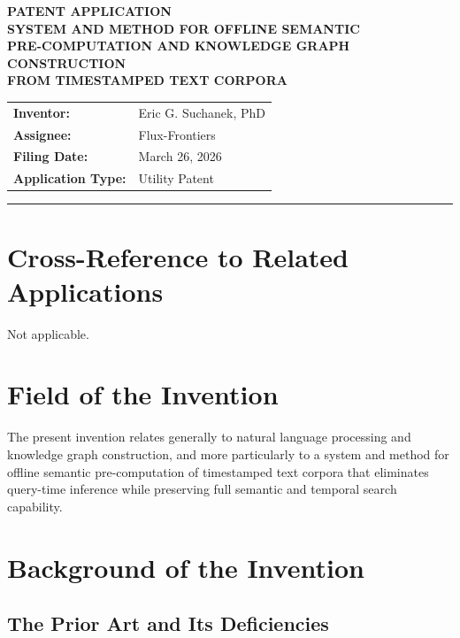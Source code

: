 \documentclass[12pt,letterpaper]{article}
\begin{document}
\begin{center}
  {\LARGE\bfseries PATENT APPLICATION}\\[14pt]
  {\large\bfseries SYSTEM AND METHOD FOR OFFLINE SEMANTIC\\
   PRE-COMPUTATION AND KNOWLEDGE GRAPH CONSTRUCTION\\
   FROM TIMESTAMPED TEXT CORPORA}\\[20pt]
  \begin{tabular}{ll}
    \textbf{Inventor:}        & Eric G. Suchanek, PhD \\[2pt]
    \textbf{Assignee:}        & Flux-Frontiers \\[2pt]
    \textbf{Filing Date:}     & March 26, 2026 \\[2pt]
    \textbf{Application Type:} & Utility Patent \\
  \end{tabular}
\end{center}

\vspace{18pt}
\noindent\rule{\linewidth}{0.8pt}
\vspace{6pt}

\section*{Cross-Reference to Related Applications}

Not applicable.

\section*{Field of the Invention}

The present invention relates generally to natural language processing and knowledge
graph construction, and more particularly to a system and method for offline semantic
pre-computation of timestamped text corpora that eliminates query-time inference while
preserving full semantic and temporal search capability.

\section*{Background of the Invention}

\subsection*{The Prior Art and Its Deficiencies}
\end{document}

